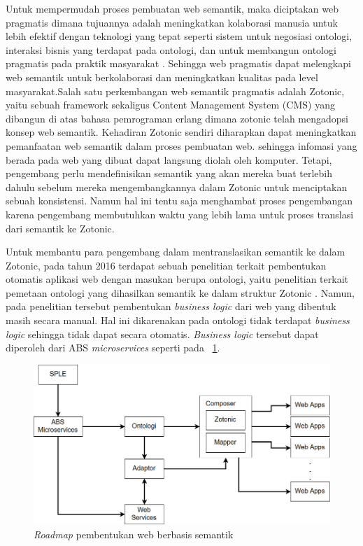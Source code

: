 Untuk mempermudah proses pembuatan web semantik, maka diciptakan web pragmatis dimana tujuannya adalah meningkatkan kolaborasi manusia untuk lebih efektif dengan teknologi yang tepat seperti sistem untuk negosiasi ontologi, interaksi bisnis yang terdapat pada ontologi, dan untuk membangun ontologi pragmatis pada praktik masyarakat \citep{pragmatic.web}. Sehingga web pragmatis dapat melengkapi web semantik untuk berkolaborasi dan meningkatkan kualitas pada level masyarakat.Salah satu perkembangan web semantik pragmatis adalah Zotonic, yaitu sebuah framework sekaligus Content Management System (CMS) yang dibangun di atas bahasa pemrograman erlang dimana zotonic telah mengadopsi konsep web semantik. Kehadiran Zotonic sendiri diharapkan dapat meningkatkan pemanfaatan web semantik dalam proses pembuatan web. sehingga infomasi yang berada pada web yang dibuat dapat langsung diolah oleh komputer. Tetapi, pengembang perlu mendefinisikan semantik yang akan mereka buat terlebih dahulu sebelum mereka mengembangkannya dalam Zotonic untuk menciptakan sebuah konsistensi. Namun hal ini tentu saja menghambat proses pengembangan karena pengembang membutuhkan waktu yang lebih lama untuk proses translasi dari semantik ke Zotonic.

Untuk membantu para pengembang dalam mentranslasikan semantik ke dalam Zotonic, pada tahun 2016 terdapat sebuah penelitian terkait pembentukan otomatis aplikasi web dengan masukan berupa ontologi, yaitu penelitian terkait pemetaan ontologi yang dihasilkan semantik ke dalam struktur Zotonic \citep{bravyto}. Namun, pada penelitian tersebut pembentukan \textit{business logic} dari web yang dibentuk masih secara manual. Hal ini dikarenakan pada ontologi tidak terdapat \textit{business logic} sehingga tidak dapat secara otomatis. \textit{Business logic} tersebut dapat diperoleh dari ABS \textit{microservices} seperti pada \pic~\ref{fig:roadmapbab1}.

\begin{figure}
	\centering
	\includegraphics[width=1\textwidth]
	{pics/roadmapbab1.jpg}
	\caption{\textit{Roadmap} pembentukan web berbasis semantik}
	\label{fig:roadmapbab1}
\end{figure}
\vspace{-0.3cm}

